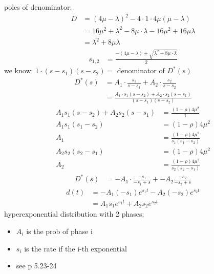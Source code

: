 poles of denominator:
\begin{align*}
D&=\left(4\mu -\lambda \right)^{2}-4\cdot 1\cdot 4\mu \left(\mu -\lambda \right)\\
&=16\mu ^{2}+\lambda ^{2}-8\mu \cdot \lambda -16\mu ^{2}+16\mu \lambda \\
&=\lambda ^{2}+8\mu \lambda 
\end{align*}
\begin{align*}
s_{{1,2}}&=\frac{-\left(4\mu -\lambda \right)\pm \sqrt{\lambda ^{2}+8\mu \cdot \lambda }}{2}
\end{align*}
we know: $1\cdot \left(s-s_{1}\right)\left(s-s_{2}\right)=$ denominator  of $D^{{\ast }}\left(s\right)$
\begin{align*}
D^{{\ast }}\left(s\right)&=A_{1}\cdot \frac{s_{1}}{s-s_{1}}+A_{2}\cdot \frac{s_{2}}{s-s_{2}}\\
&=\frac{A_{1}\cdot s_{1}\left(s-s_{2}\right)+A_{2}\cdot s_{2}\left(s-s_{1}\right)}{\left(s-s_{1}\right)\left(s-s_{2}\right)}
\end{align*}
\begin{align*}
A_{1}s_{1}\left(s-s_{2}\right)+A_{2}s_{2}\left(s-s_{1}\right)&=\frac{\left(1-\rho \right)4\mu ^{2}}{1}\\
A_{1}s_{1}\left(s_{1}-s_{2}\right)&=\left(1-\rho \right)4\mu ^{2}\\
A_{1}&=\frac{\left(1-\rho \right)4\mu ^{2}}{s_{1}\left(s_{1}-s_{2}\right)}\\
A_{2}s_{2}\left(s_{2}-s_{1}\right)&=\left(1-\rho \right)4\mu ^{2}\\
A_{2}&=\frac{\left(1-\rho \right)4\mu ^{2}}{s_{2}\left(s_{2}-s_{1}\right)}
\end{align*}
\begin{align*}
D^{{\ast }}\left(s\right)&=-A_{1}\cdot \frac{-s_{1}}{-s_{1}+s}+-A_{2}\frac{-s_{2}}{-s_{2}+s}
\end{align*}
\begin{align*}
d\left(t\right)&=-A_{1}\left(-s_{1}\right)e^{{s_{1}t}}-A_{2}\left(-s_{2}\right)e^{{s_{2}t}}\\
&=A_{1}s_{1}e^{{s_{1}t}}+A_{2}s_{2}e^{{s_{2}t}}
\end{align*}
hyperexponential distribution with 2 phases;
\begin{itemize}
\item  $A_{i}$ is the prob of phase i
\item  $s_{i}$ is the rate if the i-th exponential
\item  see p 5.23-24
\end{itemize}

